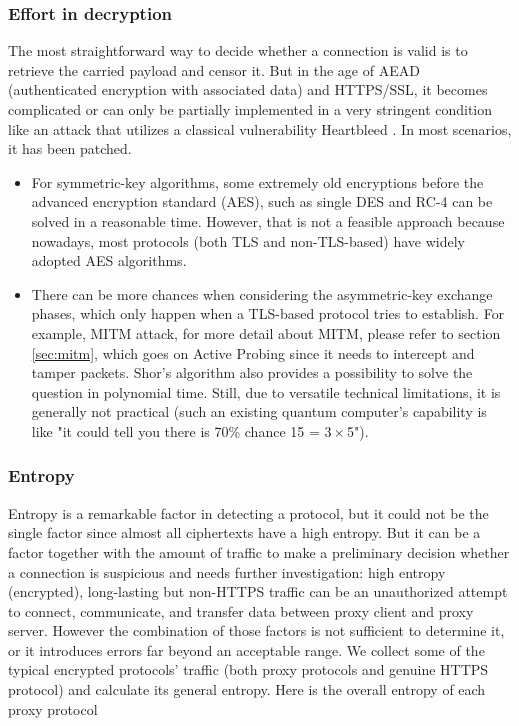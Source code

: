 \documentclass[conference]{IEEEtran}
\begin{document}
\subsubsection{Effort in decryption}
 The most straightforward way to decide whether a connection is valid is to retrieve the carried payload and censor it. But in the age of AEAD (authenticated encryption with associated data) and HTTPS/SSL, it becomes complicated or can only be partially implemented in a very stringent condition like an attack that utilizes a classical vulnerability Heartbleed \cite{Heartbleed}. In most scenarios, it has been patched. 
 \begin{itemize}
    \item  For symmetric-key algorithms, some extremely old encryptions before the advanced encryption standard (AES), such as single DES and RC-4 can be solved in a reasonable time. However, that is not a feasible approach because nowadays, most protocols (both TLS and non-TLS-based) have widely adopted AES algorithms.
    \item There can be more chances when considering the asymmetric-key exchange phases, which only happen when a TLS-based protocol tries to establish. For example, MITM attack, for more detail about MITM, please refer to section \ref{sec:mitm}, which goes on Active Probing since it needs to intercept and tamper packets. Shor’s algorithm \cite{Shors_Algorithm} also provides a possibility to solve the question in polynomial time. Still, due to versatile technical limitations, it is generally not practical (such an existing quantum computer’s capability is like "it could tell you there is 70\% chance 15 = $3\times$5").
 \end{itemize}


\subsubsection{Entropy}
Entropy is a remarkable factor in detecting a protocol, but it could not be the single factor since almost all ciphertexts have a high entropy. But it can be a factor together with the amount of traffic to make a preliminary decision whether a connection is suspicious and needs further investigation: high entropy (encrypted), long-lasting but non-HTTPS traffic can be an unauthorized attempt to connect, communicate, and transfer data between proxy client and proxy server. However the combination of those factors is not sufficient to determine it, or it introduces errors far beyond an acceptable range. 
We collect some of the typical encrypted protocols' traffic (both proxy protocols and genuine HTTPS protocol) and calculate its general entropy.
Here is the overall entropy of each proxy protocol
\end{document}
